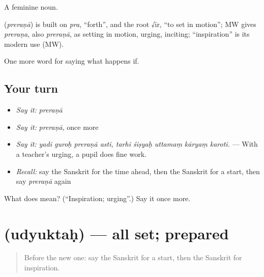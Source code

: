 A feminine noun.

\begin{cousinweb}
\textbf{} (\emph{preraṇā}) is built on \emph{pra}, \textquotedblleft{}forth\textquotedblright{}, and the root √īr, \textquotedblleft{}to set in motion\textquotedblright{}; MW gives \emph{preraṇa}, also \emph{preraṇā}, as setting in motion, urging, inciting; \textquotedblleft{}inspiration\textquotedblright{} is its modern use (MW).
\end{cousinweb}

\begin{grammarlens}[title={What you've built}]
One more word for saying what happens if.
\end{grammarlens}

\subsection*{Your turn}
\begin{itemize}
\raggedright
  \item \emph{Say it:} \emph{preraṇā}
  \item \emph{Say it:} \emph{preraṇā}, once more
  \item \emph{Say it:} \emph{yadi guroḥ preraṇā asti, tarhi śiṣyaḥ uttamaṃ kāryaṃ karoti.} — With a teacher's urging, a pupil does fine work.
  \item \emph{Recall:} say the Sanskrit for the time ahead, then the Sanskrit for a start, then say \emph{preraṇā} again
\end{itemize}

\begin{tcolorbox}[breakable,colback=teal!4,colframe=teal!35!black,title={Before you move on}]
What does  mean? (\textquotedblleft{}Inspiration; urging\textquotedblright{}.) Say it once more.
\end{tcolorbox}
\section[\texorpdfstring{\sk{उद्युक्तः} (udyuktaḥ)}{उद्युक्तः (udyuktaḥ)}]{ (udyuktaḥ) — all set; prepared}

\label{lesson:SA-C555-udyuktah}



\begin{quote}
Before the new one: say the Sanskrit for a start, then the Sanskrit for inspiration.
\end{quote}

